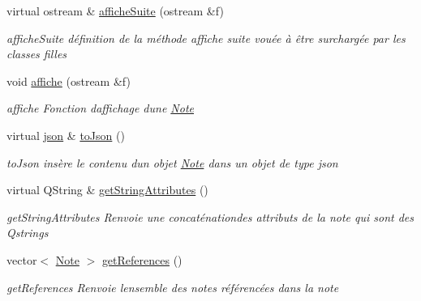 \begin{DoxyCompactItemize}
virtual ostream \& \hyperlink{classNote_ad3c0d7e48ef8244ead577128993a6f1f}{affiche\+Suite} (ostream \&f)
\begin{DoxyCompactList}\small\item\em affiche\+Suite définition de la méthode affiche suite vouée à être surchargée par les classes filles \end{DoxyCompactList}\item 
void \hyperlink{classNote_aa1130702f72fac6d9a600066d76ba939}{affiche} (ostream \&f)
\begin{DoxyCompactList}\small\item\em affiche Fonction d\textquotesingle{}affichage d\textquotesingle{}une \hyperlink{classNote}{Note} \end{DoxyCompactList}\item 
virtual \hyperlink{classnlohmann_1_1basic__json}{json} \& \hyperlink{classNote_ac5bd9736feb45b144795d7ef1fc6a1ae}{to\+Json} ()
\begin{DoxyCompactList}\small\item\em to\+Json insère le contenu d\textquotesingle{}un objet \hyperlink{classNote}{Note} dans un objet de type json \end{DoxyCompactList}\item 
virtual Q\+String \& \hyperlink{classNote_a0ffff907bdb41b8c6a4abe62dfa3a2c1}{get\+String\+Attributes} ()
\begin{DoxyCompactList}\small\item\em get\+String\+Attributes Renvoie une concaténationdes attributs de la note qui sont des Qstrings \end{DoxyCompactList}\item 
vector$<$ \hyperlink{classNote}{Note} $>$ \hyperlink{classNote_ae98495ca6805e2bfa8da4d1d03ed449b}{get\+References} ()
\begin{DoxyCompactList}\small\item\em get\+References Renvoie l\textquotesingle{}ensemble des notes référencées dans la note \end{DoxyCompactList}\end{DoxyCompactItemize}
